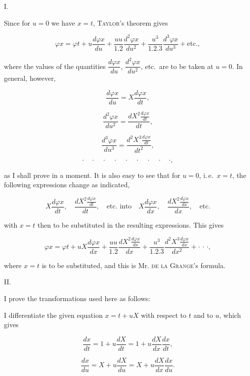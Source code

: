 
\begin{center}
I.
\end{center}

\noindent\hspace*{\parindent}Since for $u = 0$ we have $x = t$, \textsc{Taylor}'s theorem gives

\[
\varphi x = \varphi t + u \frac{d\varphi x}{du} + \frac{uu}{1.2}\frac{d^2\varphi x}{du^2}
+ \frac{u^3}{1.2.3}\frac{d^3\varphi x}{du^3} + \text{etc.},
\]

\noindent where the values of the quantities $\dfrac{d\varphi x}{du}$, $\dfrac{d^2\varphi x}{du^2}$, etc.\ are to be taken at
$u = 0$. In general, however,

\[
\frac{d\varphi x}{du} = X\frac{d\varphi x}{dt},
\]

\[
\frac{d^2\varphi x}{du^2} = \frac{dX^2 \frac{d\varphi x}{dt}}{dt},
\]

\[
\frac{d^3\varphi x}{du^3} = \frac{d^2X^3 \frac{d\varphi x}{dt}}{dt^2},
\]

\[
\cdot\quad\cdot\quad\cdot\quad\cdot\quad\cdot\quad\cdot\quad\cdot\quad\cdot\quad\cdot,
\]

\noindent as I shall prove in a moment. It is also easy to see that for $u = 0$, i.\,e.\
$x = t$, the following expressions change as indicated,

\[
X\frac{d\varphi x}{dt},\quad \frac{dX^2 \frac{d\varphi x}{dt}}{dt},\quad
\text{etc.\ into}\quad X\frac{d\varphi x}{dx},\quad \frac{dX^2 \frac{d\varphi x}{dx}}{dx},\quad \text{etc.}
\]

\noindent with $x = t$ then to be substituted in the resulting expressions. This gives

\[
\varphi x = \varphi t + uX\frac{d\varphi x}{dx} + \frac{uu}{1.2}\frac{dX^2 \frac{d\varphi x}{dx}}{dx}
+ \frac{u^3}{1.2.3}\frac{d^2X^3 \frac{d\varphi x}{dx}}{dx^2} + \cdot\,\cdot\,\cdot,
\]

\noindent where $x = t$ is to be substituted, and this is Mr. \textsc{de la Grange}'s formula.

\medskip

\begin{center}
II.
\end{center}

\noindent\hspace*{\parindent}I prove the transformations used here as follows:

\noindent\hspace*{\parindent}I differentiate the given equation $x = t + uX$ with respect to $t$ and to $u$,
which gives

\[
\frac{dx}{dt} = 1 + u\frac{dX}{dt} = 1 + u\frac{dX}{dx}\frac{dx}{dt},
\]

\[
\frac{dx}{du} = X + u\frac{dX}{du} = X + u\frac{dX}{dx}\frac{dx}{du}.
\]
